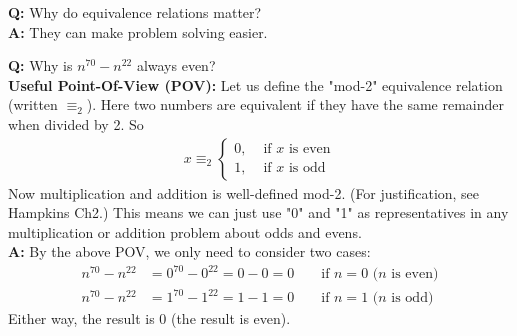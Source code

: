 \documentclass[10pt]{beamer}
\begin{document}
\begin{frame}
\footnotesize 
\begin{myredbox}[title=Remark]
\textbf{Q:} Why do equivalence relations matter?  \\
\textbf{A:} They can make problem solving easier.
\end{myredbox}

\vfill
\begin{mygreenbox}[title=Example]
\textbf{Q:} Why is $n^{70} - n^{22}$ always even? \\

\pause 
\textbf{Useful Point-Of-View (POV):} Let us define the "mod-2" equivalence relation (written $\equiv_2$).  Here two numbers are equivalent if they have the same remainder when divided by 2. \pause  So
%
\begin{align*}
	x  \equiv_2 
	\begin{cases}
0, & \text{ if $x$ is even} \\
1, & \text{ if $x$ is odd}
	\end{cases}
\end{align*}
%
\pause Now multiplication and addition is well-defined mod-2. (For justification, see Hampkins Ch2.) This means we can just use "0" and "1" as representatives in any multiplication or addition problem about odds and evens. \\

\pause 
\textbf{A:} By the above POV, we only need to consider two cases:
\begin{align*}
	n^{70} - n^{22} &= 0^{70} - 0^{22} =0-0 = 0 && \text{ if $n=0$ ($n$ is even)}\\
	n^{70} - n^{22} &= 1^{70} - 1^{22} =1-1 = 0 && \text{ if $n=1$ ($n$ is odd)}
\end{align*}
Either way, the result is 0 (the result is even).

\end{mygreenbox}

\end{frame}
\end{document}
